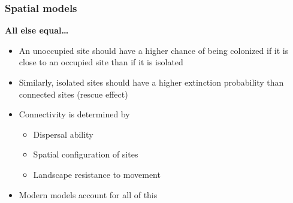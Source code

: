 \documentclass[color=usenames,dvipsnames]{beamer}\usepackage[]{graphicx}\usepackage[]{color}
\begin{document}
\begin{frame}
  \frametitle{Spatial models}
  \large
  {\bf All else equal\dots}
  \begin{itemize}[<+->]
    \item An unoccupied site should have a higher chance of being
      colonized if it is close to an occupied site than if it is isolated
    \item Similarly, isolated sites should have a higher extinction
      probability than connected sites (rescue effect)
    \item Connectivity is determined by
      \begin{itemize}
        \large
        \item Dispersal ability
        \item Spatial configuration of sites
        \item Landscape resistance to movement
      \end{itemize}
    \item Modern models account for all of this
  \end{itemize}
\end{frame}



\end{document}
